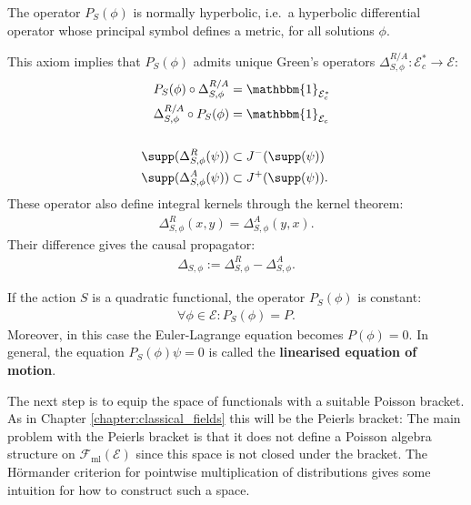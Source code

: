     \begin{axiom}
        The operator $P_S(\phi)$ is normally hyperbolic, i.e.~a hyperbolic differential operator whose principal symbol defines a metric, for all solutions $\phi$.
    \end{axiom}

    This axiom implies that $P_S(\phi)$ admits unique Green's operators $\Delta^{R/A}_{S,\phi}:\mathcal{E}^*_c\rightarrow\mathcal{E}$:
    \begin{align}
        P_S(\phi)\circ\Delta^{R/A}_{S,\phi} &= \mathbbm{1}_{\mathcal{E}^*_c}\\
        \Delta^{R/A}_{S,\phi}\circ P_S(\phi) &= \mathbbm{1}_{\mathcal{E}_c}\\&\nonumber\\
        \supp(\Delta^R_{S,\phi}(\psi)) &\subset J^-(\supp(\psi))\\
        \supp(\Delta^A_{S,\phi}(\psi)) &\subset J^+(\supp(\psi)).
    \end{align}
    These operator also define integral kernels through the kernel theorem:
    \begin{gather}
        \Delta^R_{S,\phi}(x,y) = \Delta^A_{S,\phi}(y,x).
    \end{gather}
    Their difference gives the causal propagator:
    \begin{gather}
        \Delta_{S,\phi} := \Delta^R_{S,\phi} - \Delta^A_{S,\phi}.
    \end{gather}

    \begin{property}
        If the action $S$ is a quadratic functional, the operator $P_S(\phi)$ is constant:
        \begin{gather}
            \forall\phi\in\mathcal{E}:P_S(\phi)=P.
        \end{gather}
        Moreover, in this case the Euler-Lagrange equation becomes $P(\phi) = 0$. In general, the equation $P_S(\phi)\psi=0$ is called the \textbf{linearised equation of motion}.
    \end{property}

    The next step is to equip the space of functionals with a suitable Poisson bracket. As in Chapter \ref{chapter:classical_fields} this will be the Peierls bracket:
    The main problem with the Peierls bracket is that it does not define a Poisson algebra structure on $\mathcal{F}_\mathrm{ml}(\mathcal{E})$ since this space is not closed under the bracket. The H\"ormander criterion for pointwise multiplication of distributions gives some intuition for how to construct such a space.

